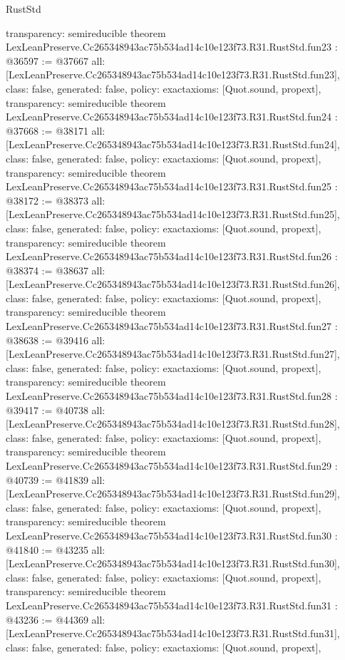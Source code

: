 \begin{lexlean}{RustStd}
\begin{coremodule}
{  transparency: semireducible
}
theorem LexLeanPreserve.Cc265348943ac75b534ad14c10e123f73.R31.RustStd.fun23 : @36597 := @37667 {
  all: [LexLeanPreserve.Cc265348943ac75b534ad14c10e123f73.R31.RustStd.fun23],
  class: false,
  generated: false,
  policy: exact{axioms: [Quot.sound, propext]},
  transparency: semireducible
}
theorem LexLeanPreserve.Cc265348943ac75b534ad14c10e123f73.R31.RustStd.fun24 : @37668 := @38171 {
  all: [LexLeanPreserve.Cc265348943ac75b534ad14c10e123f73.R31.RustStd.fun24],
  class: false,
  generated: false,
  policy: exact{axioms: [Quot.sound, propext]},
  transparency: semireducible
}
theorem LexLeanPreserve.Cc265348943ac75b534ad14c10e123f73.R31.RustStd.fun25 : @38172 := @38373 {
  all: [LexLeanPreserve.Cc265348943ac75b534ad14c10e123f73.R31.RustStd.fun25],
  class: false,
  generated: false,
  policy: exact{axioms: [Quot.sound, propext]},
  transparency: semireducible
}
theorem LexLeanPreserve.Cc265348943ac75b534ad14c10e123f73.R31.RustStd.fun26 : @38374 := @38637 {
  all: [LexLeanPreserve.Cc265348943ac75b534ad14c10e123f73.R31.RustStd.fun26],
  class: false,
  generated: false,
  policy: exact{axioms: [Quot.sound, propext]},
  transparency: semireducible
}
theorem LexLeanPreserve.Cc265348943ac75b534ad14c10e123f73.R31.RustStd.fun27 : @38638 := @39416 {
  all: [LexLeanPreserve.Cc265348943ac75b534ad14c10e123f73.R31.RustStd.fun27],
  class: false,
  generated: false,
  policy: exact{axioms: [Quot.sound, propext]},
  transparency: semireducible
}
theorem LexLeanPreserve.Cc265348943ac75b534ad14c10e123f73.R31.RustStd.fun28 : @39417 := @40738 {
  all: [LexLeanPreserve.Cc265348943ac75b534ad14c10e123f73.R31.RustStd.fun28],
  class: false,
  generated: false,
  policy: exact{axioms: [Quot.sound, propext]},
  transparency: semireducible
}
theorem LexLeanPreserve.Cc265348943ac75b534ad14c10e123f73.R31.RustStd.fun29 : @40739 := @41839 {
  all: [LexLeanPreserve.Cc265348943ac75b534ad14c10e123f73.R31.RustStd.fun29],
  class: false,
  generated: false,
  policy: exact{axioms: [Quot.sound, propext]},
  transparency: semireducible
}
theorem LexLeanPreserve.Cc265348943ac75b534ad14c10e123f73.R31.RustStd.fun30 : @41840 := @43235 {
  all: [LexLeanPreserve.Cc265348943ac75b534ad14c10e123f73.R31.RustStd.fun30],
  class: false,
  generated: false,
  policy: exact{axioms: [Quot.sound, propext]},
  transparency: semireducible
}
theorem LexLeanPreserve.Cc265348943ac75b534ad14c10e123f73.R31.RustStd.fun31 : @43236 := @44369 {
  all: [LexLeanPreserve.Cc265348943ac75b534ad14c10e123f73.R31.RustStd.fun31],
  class: false,
  generated: false,
  policy: exact{axioms: [Quot.sound, propext]},
}
\end{coremodule}
\end{lexlean}

